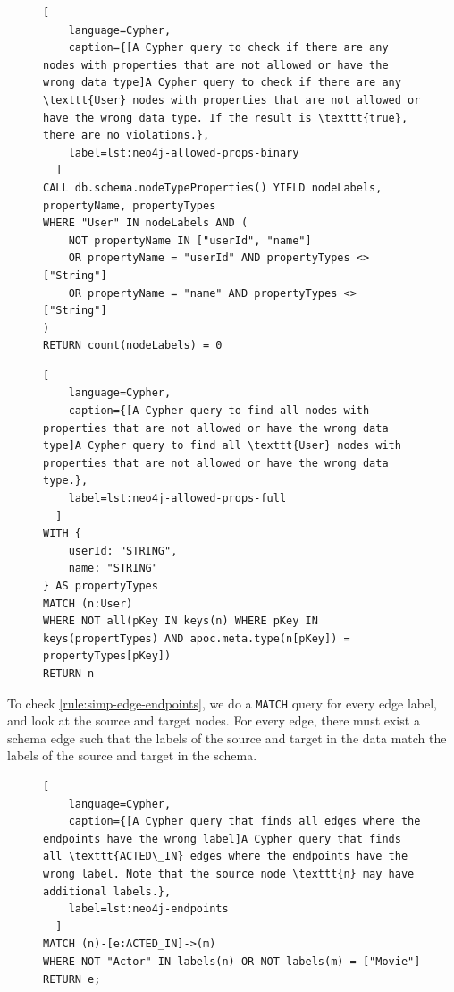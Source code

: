\documentclass{report}
\theoremstyle{definition}
\begin{document}
\begin{figure}[H]
  \begin{lstlisting}[
    language=Cypher,
    caption={[A Cypher query to check if there are any nodes with properties that are not allowed or have the wrong data type]A Cypher query to check if there are any \texttt{User} nodes with properties that are not allowed or have the wrong data type. If the result is \texttt{true}, there are no violations.},
    label=lst:neo4j-allowed-props-binary
  ]
CALL db.schema.nodeTypeProperties() YIELD nodeLabels, propertyName, propertyTypes
WHERE "User" IN nodeLabels AND (
    NOT propertyName IN ["userId", "name"]
    OR propertyName = "userId" AND propertyTypes <> ["String"]
    OR propertyName = "name" AND propertyTypes <> ["String"]
)
RETURN count(nodeLabels) = 0
  \end{lstlisting}
\end{figure}
\vspace*{-8pt}
\begin{figure}[H]
  \begin{lstlisting}[
    language=Cypher,
    caption={[A Cypher query to find all nodes with properties that are not allowed or have the wrong data type]A Cypher query to find all \texttt{User} nodes with properties that are not allowed or have the wrong data type.},
    label=lst:neo4j-allowed-props-full
  ]
WITH {
    userId: "STRING",
    name: "STRING"
} AS propertyTypes
MATCH (n:User)
WHERE NOT all(pKey IN keys(n) WHERE pKey IN keys(propertTypes) AND apoc.meta.type(n[pKey]) = propertyTypes[pKey])
RETURN n
  \end{lstlisting}
\end{figure}

To check \autoref{rule:simp-edge-endpoints}, we do a \texttt{MATCH} query for every edge label, and look at the source and target nodes. For every edge, there must exist a schema edge such that the labels of the source and target in the data match the labels of the source and target in the schema.

\begin{figure}[H]
  \begin{lstlisting}[
    language=Cypher,
    caption={[A Cypher query that finds all edges where the endpoints have the wrong label]A Cypher query that finds all \texttt{ACTED\_IN} edges where the endpoints have the wrong label. Note that the source node \texttt{n} may have additional labels.},
    label=lst:neo4j-endpoints
  ]
MATCH (n)-[e:ACTED_IN]->(m)
WHERE NOT "Actor" IN labels(n) OR NOT labels(m) = ["Movie"]
RETURN e;
  \end{lstlisting}
\end{figure}
\end{document}
